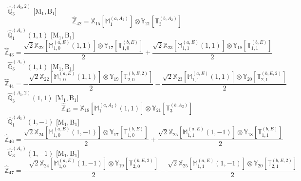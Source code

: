 \documentclass[fleqn,10pt,landscape]{article}
\begin{document}
\begin{itemize}
\begin{dmath*}
\end{dmath*}
\vspace{4mm}
\noindent {} $\,\,\,\hat{\mathbb{Q}}_{3}^{(A_{1},2)}$ [M$_{1}$,\,B$_{1}$]
\begin{dmath*}
\hat{\mathbb{Z}}_{42}=\mathbb{X}_{15}[\mathbb{M}_{1}^{(a,A_{2})}] \otimes\mathbb{Y}_{21}[\mathbb{T}_{3}^{(b,A_{2})}]
\end{dmath*}
\vspace{4mm}
\noindent {} $\,\,\,\hat{\mathbb{Q}}_{1}^{(A_{1})}(1,1)$ [M$_{1}$,\,B$_{1}$]
\begin{dmath*}
\hat{\mathbb{Z}}_{43}=\frac{\sqrt{2} \mathbb{X}_{22}[\mathbb{M}_{1,0}^{(a,E)}(1,1)] \otimes\mathbb{Y}_{17}[\mathbb{T}_{1,0}^{(b,E)}]}{2} + \frac{\sqrt{2} \mathbb{X}_{23}[\mathbb{M}_{1,1}^{(a,E)}(1,1)] \otimes\mathbb{Y}_{18}[\mathbb{T}_{1,1}^{(b,E)}]}{2}
\end{dmath*}
\vspace{4mm}
\noindent {} $\,\,\,\hat{\mathbb{G}}_{3}^{(A_{1})}(1,1)$ [M$_{1}$,\,B$_{1}$]
\begin{dmath*}
\hat{\mathbb{Z}}_{44}=- \frac{\sqrt{2} \mathbb{X}_{22}[\mathbb{M}_{1,0}^{(a,E)}(1,1)] \otimes\mathbb{Y}_{19}[\mathbb{T}_{2,0}^{(b,E,2)}]}{2} - \frac{\sqrt{2} \mathbb{X}_{23}[\mathbb{M}_{1,1}^{(a,E)}(1,1)] \otimes\mathbb{Y}_{20}[\mathbb{T}_{2,1}^{(b,E,2)}]}{2}
\end{dmath*}
\vspace{4mm}
\noindent {} $\,\,\,\hat{\mathbb{Q}}_{3}^{(A_{1},2)}(1,1)$ [M$_{1}$,\,B$_{1}$]
\begin{dmath*}
\hat{\mathbb{Z}}_{45}=\mathbb{X}_{18}[\mathbb{M}_{1}^{(a,A_{2})}(1,1)] \otimes\mathbb{Y}_{21}[\mathbb{T}_{3}^{(b,A_{2})}]
\end{dmath*}
\vspace{4mm}
\noindent {} $\,\,\,\hat{\mathbb{Q}}_{1}^{(A_{1})}(1,-1)$ [M$_{1}$,\,B$_{1}$]
\begin{dmath*}
\hat{\mathbb{Z}}_{46}=\frac{\sqrt{2} \mathbb{X}_{24}[\mathbb{M}_{1,0}^{(a,E)}(1,-1)] \otimes\mathbb{Y}_{17}[\mathbb{T}_{1,0}^{(b,E)}]}{2} + \frac{\sqrt{2} \mathbb{X}_{25}[\mathbb{M}_{1,1}^{(a,E)}(1,-1)] \otimes\mathbb{Y}_{18}[\mathbb{T}_{1,1}^{(b,E)}]}{2}
\end{dmath*}
\vspace{4mm}
\noindent {} $\,\,\,\hat{\mathbb{G}}_{3}^{(A_{1})}(1,-1)$ [M$_{1}$,\,B$_{1}$]
\begin{dmath*}
\hat{\mathbb{Z}}_{47}=- \frac{\sqrt{2} \mathbb{X}_{24}[\mathbb{M}_{1,0}^{(a,E)}(1,-1)] \otimes\mathbb{Y}_{19}[\mathbb{T}_{2,0}^{(b,E,2)}]}{2} - \frac{\sqrt{2} \mathbb{X}_{25}[\mathbb{M}_{1,1}^{(a,E)}(1,-1)] \otimes\mathbb{Y}_{20}[\mathbb{T}_{2,1}^{(b,E,2)}]}{2}

\end{dmath*}
\end{itemize}
\end{document}
